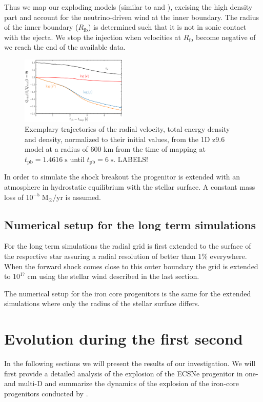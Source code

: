 \documentclass[fleqn,usenatbib]{mnras}
\newcommand{\COM}[1]{{\color{red}#1}}
\begin{document}
Thus we map our exploding models (similar to \cite{Wongwathanarat2012} and \cite{Mueller2019}), excising the high density part and account for the neutrino-driven wind at the inner boundary. The radius of the inner boundary ($R_{\text{ib}}$) is determined such that it is not in sonic contact with the ejecta. We stop the injection when velocities at $R_{\text{ib}}$ become negative of we reach the end of the available data.

\begin{figure}
\label{fig:wind}
 \centering
 \includegraphics[width=0.45\textwidth]{./pic/wind.pdf}
 \caption{Exemplary trajectories of the radial velocity, total energy density and  density, normalized to their initial values, from the 1D z9.6 model at a radius of 600 km from the time of mapping at $t_{\mathrm{pb}}= 1.4616\;\mathrm{s}$ until $t_{\mathrm{pb}}= 6\;\mathrm{s}$. \COM{LABELS!} }
\end{figure}

In order to simulate the shock breakout the progenitor is extended with an atmosphere in hydrostatic equilibrium with the stellar surface. A constant mass loss of $10^{-5}\;\mathrm{M_{\odot}/yr}$ is assumed. 

\subsection{Numerical setup for the long term simulations}

For the long term simulations the radial grid is first extended to the surface of the respective star assuring a radial resolution of better than 1\% everywhere. When the forward shock comes close to this outer boundary the grid is extended to $10^{17}\;\mathrm{cm}$ using the stellar wind described in the last section. 

The numerical setup for the iron core progenitors is the same for the extended simulations where only the radius of the stellar surface differs. 

\section{Evolution during the first second}
In the following sections we will present the results of our investigation. We will first provide a detailed analysis of the explosion of the ECSNe progenitor in one- and multi-D and summarize the dynamics of the explosion of the iron-core progenitors conducted by \cite{Melson2015}. 
\end{document}
